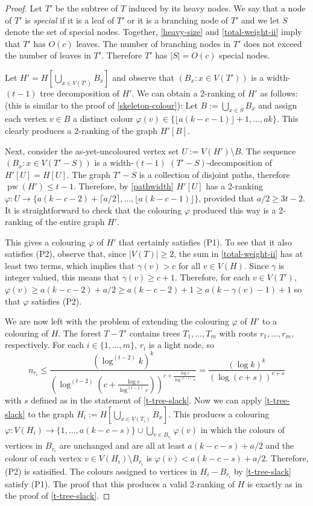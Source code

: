 \documentclass[kpfonts]{patmorin}
\DeclareMathOperator{\pw}{pw}
\theoremstyle{named}
\begin{document}
\begin{proof}
    Let $T'$ be the subtree of $T$ induced by its heavy nodes.  We say that a node of $T'$ is \emph{special} if it is a leaf of $T'$ or it is a branching node of $T'$ and we let $S$ denote the set of special nodes.  Together, \cref{heavy-size} and \cref{total-weight-ii} imply that $T'$ has $O(c)$ leaves.  The number of branching nodes in $T'$ does not exceed the number of leaves in $T'$.   Therefore $T'$ has $|S|=O(c)$ special nodes.

    Let $H'=H[\bigcup_{x\in V(T')} B_x]$ and observe that $(B_x:x\in V(T'))$ is a width-$(t-1)$ tree decomposition of $H'$.  We can obtain a 2-ranking of $H'$ as follows: (this is similar to the proof of \cref{skeleton-colour}):  Let $B:=\bigcup_{x\in S} B_x$ and assign each vertex  $v\in B$ a distinct colour $\varphi(v)\in\{\lfloor a(k-c-1)\rfloor+1,\ldots,ak\}$.  This clearly produces a 2-ranking of the graph $H'[B]$.

    Next, consider the as-yet-uncoloured vertex set $U:=V(H')\setminus B$. The sequence $(B_x:x\in V(T'-S))$ is a width-$(t-1)$ $(T'-S)$-decomposition of $H'[U]=H[U]$. The graph $T'-S$ is a collection of disjoint paths, therefore $\pw(H')\le t-1$. Therefore, by \cref{pathwidth} $H'[U]$ has a 2-ranking $\varphi:U\to \{a(k-c-2)+\lceil a/2\rceil,\ldots,\lfloor a(k-c-1)\rfloor\}$, provided that $a/2\ge 3t-2$.  It is straightforward to check that the colouring $\varphi$ produced this way is a 2-ranking of the entire graph $H'$.

    This gives a colouring $\varphi$ of $H'$ that certainly satisfies (P1).  To see that it also satisfies (P2), observe that, since $|V(T)|\ge 2$, the sum in \cref{total-weight-ii} has at least two terms, which implies that $\gamma(v) > c$ for all $v\in V(H)$. Since $\gamma$ is integer valued, this means that $\gamma(v)\ge c+1$.  Therefore, for each $v\in V(T')$, $\varphi(v)\ge a(k-c-2)+a/2 \ge a(k-c-2)+1\ge a(k-\gamma(v)-1)+1$ so that $\varphi$ satisfies (P2).

    We are now left with the problem of extending the colouring $\varphi$ of $H'$ to a colouring of $H$.  The forest $T-T'$ contains trees $T_1,\ldots,T_m$ with roots $r_1,\ldots,r_m$, respectively.  For each $i\in\{1,\ldots,m\}$, $r_i$ is a light node, so
    \[
        n_{r_i} \le \frac{(\log^{(t-2)} k)^k}{\left(\log^{(t-2)}\left(c + \frac{\log c}{\log^{(t-1)} c}\right)\right)^{c+\frac{\log c}{\log^{(t-1)} c}}}
        = \frac{(\log k)^k}{\left(\log\left(c + s\right)\right)^{c+s}}
    \]
    with $s$ defined as in the statement of \cref{t-tree-slack}.
    Now we can apply \cref{t-tree-slack} to the graph $H_{i}:=H[\bigcup_{x\in V(T_{i})} B_x]$.  This produces a colouring $\varphi:V(H_i)\to\{1,\ldots,a(k-c-s)\}\cup \bigcup_{v\in B_{r_i}}\varphi(v)$ in which the colours of vertices in $B_{r_i}$ are unchanged and are all at least $a(k-c-s)+a/2$ and the colour of each vertex $v\in V(H_i)\setminus B_{r_i}$ is $\varphi(v)<a(k-c-s)+a/2$.  Therefore, (P2) is satisified.  The colours assigned to vertices in $H_i-B_{r_i}$ by \cref{t-tree-slack} satisfy (P1).
    The proof that this produces a valid 2-ranking of $H$ is exactly as in the proof of \cref{t-tree-slack}.
\end{proof}
\end{document}
